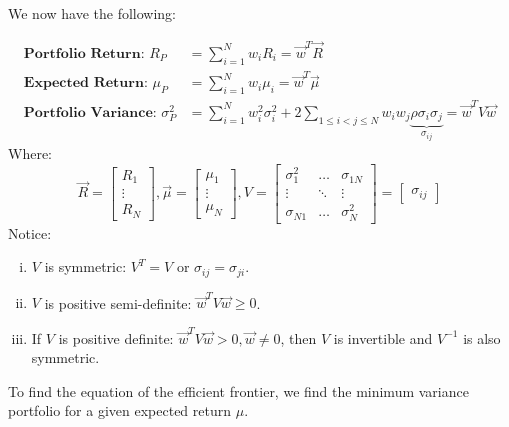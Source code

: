 We now have the following:
\begin{framed}
    \begin{align*}
        \textbf{Portfolio Return: } R_P &= \sum_{i=1}^N w_iR_i = \vec{w}^T\vec{R} \\
        \textbf{Expected Return: } \mu_P &= \sum_{i=1}^N w_i \mu_i = \vec{w}^T \vec{\mu} \\
        \textbf{Portfolio Variance: }             \sigma_P^2 &= \sum_{i=1}^N w_i^2 \sigma_i^2 + 2 \sum_{1 \leq i < j \le N} w_iw_j\underbrace{\rho \sigma_i \sigma_j}_{\sigma_{ij}} = \vec{w}^T V\vec{w}
    \end{align*}
    Where:
    \begin{equation*}
        \vec{R} = \begin{bmatrix}
            R_1 \\ \vdots \\ R_N
        \end{bmatrix}, \vec{\mu} = \begin{bmatrix}
            \mu_1 \\ \vdots \\ \mu_N
        \end{bmatrix}, V = \begin{bmatrix}
            \sigma_1^2 & \dots & \sigma_{1N} \\ \vdots & \ddots & \vdots \\ \sigma_{N1} & \dots & \sigma_N^2
        \end{bmatrix} = \begin{bmatrix}
            \sigma_{ij}
        \end{bmatrix}
    \end{equation*}
    Notice:
    \begin{enumerate}[i.]
        \item \(V\) is symmetric: \(V^T = V\) or \(\sigma_{ij} = \sigma_{ji}\).
        \item \(V\) is positive semi-definite: \(\vec{w}^TV\vec{w} \ge 0\).
        \item If \(V\) is positive definite: \(\vec{w}^T V \vec{w} > 0, \vec{w} \neq 0\), then \(V\) is invertible and \(V^{-1}\) is also symmetric.
    \end{enumerate}
\end{framed}
To find the equation of the efficient frontier, we find the minimum variance portfolio for a given expected return \(\mu\).

